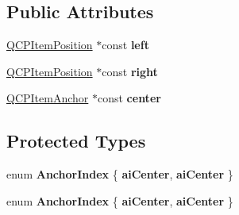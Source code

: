 \subsection*{Public Attributes}
\begin{DoxyCompactItemize}
\item 
\hyperlink{class_q_c_p_item_position}{Q\+C\+P\+Item\+Position} $\ast$const {\bfseries left}\hypertarget{class_q_c_p_item_bracket_a63902fc210ba92a43450960f482ff247}{}\label{class_q_c_p_item_bracket_a63902fc210ba92a43450960f482ff247}

\item 
\hyperlink{class_q_c_p_item_position}{Q\+C\+P\+Item\+Position} $\ast$const {\bfseries right}\hypertarget{class_q_c_p_item_bracket_ac5f733b140234c3d7a22397faa02e0f7}{}\label{class_q_c_p_item_bracket_ac5f733b140234c3d7a22397faa02e0f7}

\item 
\hyperlink{class_q_c_p_item_anchor}{Q\+C\+P\+Item\+Anchor} $\ast$const {\bfseries center}\hypertarget{class_q_c_p_item_bracket_a9d457b70c5952a594e6b8af21a1d53be}{}\label{class_q_c_p_item_bracket_a9d457b70c5952a594e6b8af21a1d53be}

\end{DoxyCompactItemize}
\subsection*{Protected Types}
\begin{DoxyCompactItemize}
\item 
enum {\bfseries Anchor\+Index} \{ {\bfseries ai\+Center}, 
{\bfseries ai\+Center}
 \}\hypertarget{class_q_c_p_item_bracket_a7f3a6a56d67f71219ed220553f3dd861}{}\label{class_q_c_p_item_bracket_a7f3a6a56d67f71219ed220553f3dd861}

\item 
enum {\bfseries Anchor\+Index} \{ {\bfseries ai\+Center}, 
{\bfseries ai\+Center}
 \}\hypertarget{class_q_c_p_item_bracket_a7f3a6a56d67f71219ed220553f3dd861}{}\label{class_q_c_p_item_bracket_a7f3a6a56d67f71219ed220553f3dd861}

\end{DoxyCompactItemize}
